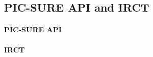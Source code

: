 
\subsection{PIC-SURE API and IRCT}
\label{sec:bg-picsure}



\paragraph{PIC-SURE API}



\paragraph{IRCT}



